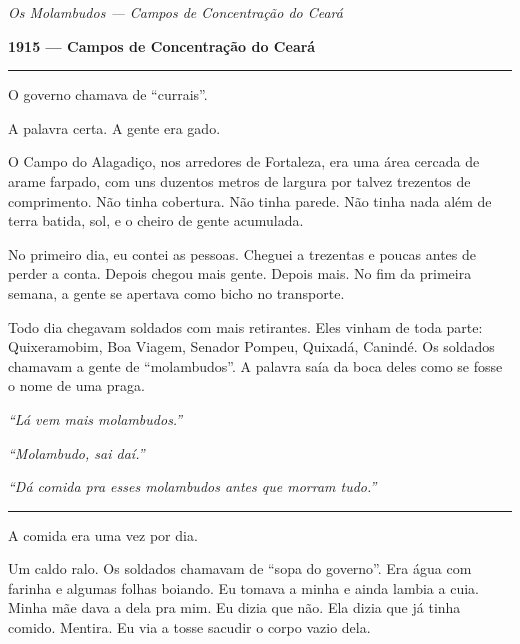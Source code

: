 
\noindent \textit{Os Molambudos --- Campos de Concentração do Ceará}

\noindent \textbf{1915 --- Campos de Concentração do Ceará}

\vspace{0.5em}\noindent\rule{\textwidth}{0.5pt}\vspace{0.5em}

\noindent O governo chamava de \textquotedblleft{}currais\textquotedblright{}.

\noindent A palavra certa. A gente era gado.

\noindent O Campo do Alagadiço, nos arredores de Fortaleza, era uma área cercada de arame farpado, com uns duzentos metros de largura por talvez trezentos de comprimento. Não tinha cobertura. Não tinha parede. Não tinha nada além de terra batida, sol, e o cheiro de gente acumulada.

\noindent No primeiro dia, eu contei as pessoas. Cheguei a trezentas e poucas antes de perder a conta. Depois chegou mais gente. Depois mais. No fim da primeira semana, a gente se apertava como bicho no transporte.

\noindent Todo dia chegavam soldados com mais retirantes. Eles vinham de toda parte: Quixeramobim, Boa Viagem, Senador Pompeu, Quixadá, Canindé. Os soldados chamavam a gente de \textquotedblleft{}molambudos\textquotedblright{}. A palavra saía da boca deles como se fosse o nome de uma praga.

\noindent \textit{\textquotedblleft{}Lá vem mais molambudos.\textquotedblright{}}

\noindent \textit{\textquotedblleft{}Molambudo, sai daí.\textquotedblright{}}

\noindent \textit{\textquotedblleft{}Dá comida pra esses molambudos antes que morram tudo.\textquotedblright{}}

\vspace{0.5em}\noindent\rule{\textwidth}{0.5pt}\vspace{0.5em}

\noindent A comida era uma vez por dia.

\noindent Um caldo ralo. Os soldados chamavam de \textquotedblleft{}sopa do governo\textquotedblright{}. Era água com farinha e algumas folhas boiando. Eu tomava a minha e ainda lambia a cuia. Minha mãe dava a dela pra mim. Eu dizia que não. Ela dizia que já tinha comido. Mentira. Eu via a tosse sacudir o corpo vazio dela.

